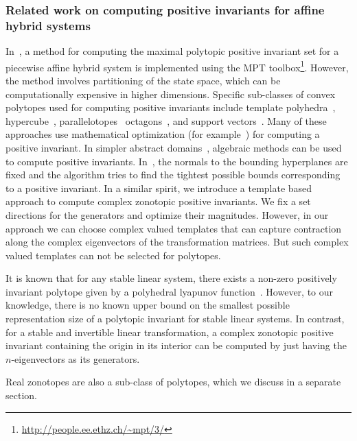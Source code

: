 \subsubsection{Related work on computing positive invariants for
affine hybrid systems}  In~\cite{rakovic2004computation}, a method for computing the
maximal polytopic positive invariant set for a piecewise affine hybrid
system is implemented using the MPT
toolbox\footnote{\url{http://people.ee.ethz.ch/~mpt/3/}}.  However,
the method involves partitioning of the state space, which can be
computationally expensive in higher dimensions.  Specific sub-classes
of convex polytopes used for computing positive invariants include
template
polyhedra~\cite{Gawlitza,Sankaranarayanan+Dang+Ivancic-08-Symbolic},
hypercube~\cite{cousot1976static,tiwari2008generating},
parallelotopes~\cite{amato2012abstract}
octagons~\cite{DBLP:journals/lisp/Mine06}, and support
vectors~\cite{FLD+11}.  Many of these approaches use mathematical
optimization (for example~\cite{Gawlitza,dang1998reachability}) for
computing a positive invariant.  In simpler abstract
domains~\cite{DBLP:journals/lisp/Mine06,cousot1976static,amato2012abstract},
algebraic methods can be used to compute positive invariants.
In~\cite{Gawlitza}, the normals to the bounding hyperplanes are fixed
and the algorithm tries to find the tightest possible bounds
corresponding to a positive invariant.  In a similar spirit, we
introduce a template based approach to compute complex zonotopic
positive invariants. We fix a set directions for the generators and
optimize their magnitudes.  However, in our approach we can choose
complex valued templates that can capture contraction along the
complex eigenvectors of the transformation matrices.  But such complex
valued templates can not be selected for polytopes.

It is known that for any stable linear system, there exists a non-zero
positively invariant polytope given by a polyhedral lyapunov
function~\cite{blanchini2008set}.  However, to our knowledge, there is
no known upper bound on the smallest possible representation size of a
polytopic invariant for stable linear systems.  In contrast, for a stable and
invertible linear transformation, a complex zonotopic positive
invariant containing the origin in its interior can be computed by
just having the $n$-eigenvectors as its generators.

Real zonotopes are also a sub-class of polytopes, which we discuss in
a separate section.

          

